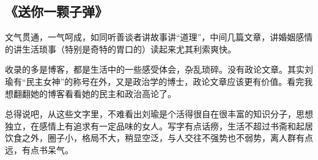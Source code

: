 \subsection{《送你一颗子弹》}
文气贯通，一气呵成，如同听善谈者讲故事讲“道理”，中间几篇文章，讲婚姻感情的讲生活琐事（特别是奇特的胃口的）读起来尤其利索爽快。

收录的多是博客，都是生活中的一些感受体会，杂乱琐碎。没有政论文章。其实刘瑜有“民主女神”的称号在外，又是政治学的博士，政论文章应该更有价值。看完我想翻翻她的博客看看她的民主和政治高论了。

总得说吧，从这些文字里，不难看出刘瑜是个活得很自在很丰富的知识分子，思想独立，在感情上有追求有一定品味的女人。写字有点话痨，生活不超过书斋和起居饮食之外，圈子小，格局不大，稍显空泛，与人交往不强势也不弱势，离人群有点远，有点书呆气。